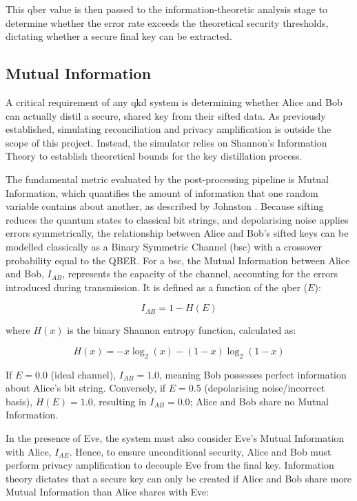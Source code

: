 This \gls{qber} value is then passed to the information-theoretic analysis stage to determine whether the error rate exceeds the theoretical security thresholds, dictating whether a secure final key can be extracted.

\subsection{Mutual Information}
\label{subsec:mutualinfo}

A critical requirement of any \gls{qkd} system is determining whether Alice and Bob can actually distil a secure, shared key from their sifted data. As previously established, simulating reconciliation and privacy amplification is outside the scope of this project. Instead, the simulator relies on Shannon's Information Theory to establish theoretical bounds for the key distillation process.

The fundamental metric evaluated by the post-processing pipeline is Mutual Information, which quantifies the amount of information that one random variable contains about another, as described by Johnston \cite{mutualInfo}. Because sifting reduces the quantum states to classical bit strings, and depolarising noise applies errors symmetrically, the relationship between Alice and Bob's sifted keys can be modelled classically as a Binary Symmetric Channel (\gls{bsc}) with a crossover probability equal to the QBER. For a \gls{bsc}, the Mutual Information between Alice and Bob, $I_{AB}$, represents the capacity of the channel, accounting for the errors introduced during transmission. It is defined as a function of the \gls{qber} ($E$):

\begin{equation}
I_{AB} = 1 - H(E)
\label{eq:mutual_info_ab}
\end{equation}

where $H(x)$ is the binary Shannon entropy function, calculated as:

\begin{equation}
H(x) = -x \log_2(x) - (1-x) \log_2(1-x)
\label{eq:shannon_entropy}
\end{equation}

If $E = 0.0$ (ideal channel), $I_{AB} = 1.0$, meaning Bob possesses perfect information about Alice's bit string. Conversely, if $E = 0.5$ (depolarising noise/incorrect basis), $H(E) = 1.0$, resulting in $I_{AB} = 0.0$; Alice and Bob share no Mutual Information.

In the presence of Eve, the system must also consider Eve's Mutual Information with Alice, $I_{AE}$. Hence, to ensure unconditional security, Alice and Bob must perform privacy amplification to decouple Eve from the final key. Information theory dictates that a secure key can only be created if Alice and Bob share more Mutual Information than Alice shares with Eve:

